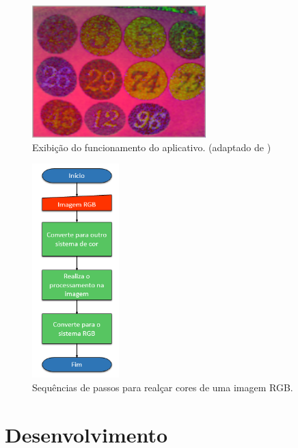 \documentclass[	12pt, Times, openright, twoside, a4paper, english, brazil]{abntex2}
\begin{document}
\begin{figure}[!htb]
\centering \includegraphics[width=0.6\textwidth]{figureChromophore.png}
\caption{Exibição do funcionamento do aplicativo. (adaptado de ) \label{fig:figuraChromophore}}
\end{figure}

\begin{figure}[!htb]
\centering \includegraphics[width=0.30\textwidth]{figuraFluxoCorrecao.PNG}
\caption{Sequências de passos para realçar cores de uma imagem RGB. \label{fig:figFluxoCorrecao}}
\end{figure}

% 

\chapter{Desenvolvimento}
\end{document}

